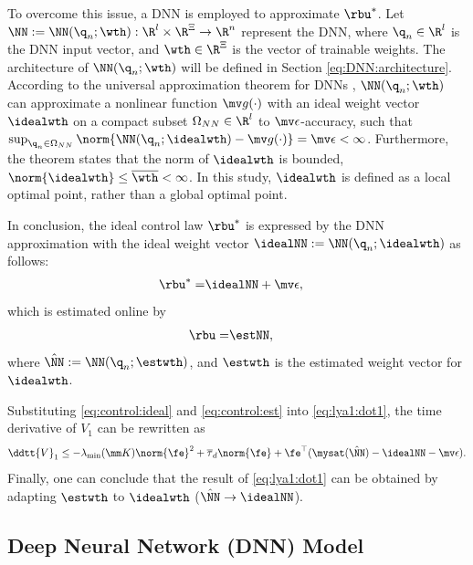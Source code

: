 \documentclass[final,5p,times,twocolumn,authoryear]{elsarticle}
\begin{document}
To overcome this issue, a DNN is employed to approximate $\rbu^*$.
Let $\NN:=\NN({\q}_n;\wth): \R^{l}\times\R^{\Xi}\to\R^{n}$ represent the DNN, where ${\q}_n\in\R^{l}$ is the DNN input vector, and $\wth\in\R^{\Xi}$ is the vector of trainable weights.
The architecture of $\NN({\q}_n;\wth)$ will be defined in Section \ref{eq:DNN:architecture}.
According to the universal approximation theorem for DNNs \cite{Kidger:2020aa}, $\NN({\q}_n;\wth)$ can approximate a nonlinear function $\mv g(\cdot)$ with an ideal weight vector $\idealwth$ on a compact subset $\Omega_{NN}\in\R^{l}$ to $\mv\epsilon$-accuracy, such that $\sup_{{\q}_n\in\Omega_{NN}}\norm{ \NN({\q}_n;\idealwth) - \mv g(\cdot)} = \mv\epsilon < \infty$.
Furthermore, the theorem states that the norm of $\idealwth$ is bounded, \ie $\norm{\idealwth}\le \overline\wth<\infty$.
In this study, $\idealwth$ is defined as a local optimal point, rather than a global optimal point.

In conclusion, the ideal control law $\rbu^*$ is expressed by the DNN approximation with the ideal weight vector $\idealNN:=\NN({\q}_n;\idealwth)$ as follows:
\begin{align}
    \rbu^*=& \idealNN+\mv\epsilon,
    \label{eq:control:ideal}
\end{align}
which is estimated online by
\begin{align}
    \rbu =& \estNN,
    \label{eq:control:est}
\end{align}
where $\hat\NN:=\NN({\q}_n;\estwth)$, and  $\estwth$ is the estimated weight vector for $\idealwth$.

Substituting \eqref{eq:control:ideal} and \eqref{eq:control:est} into \eqref{eq:lya1:dot1}, the time derivative of $V_1$ can be rewritten as
\begin{equation}
    \ddtt{V}_1
    \le 
    -\lambda_{\min}(\mm K)\norm{\fe}^2
    +
    \overline\tau_d\norm{\fe}
    +
    \fe^\top (\mysat(\hat\NN)-\idealNN-\mv\epsilon)
    .
    \label{eq:lya1:dot2}
\end{equation}
Finally, one can conclude that the result of \eqref{eq:lya1:dot1} can be obtained by adapting $\estwth$ to $\idealwth$ (\ie $\hat\NN\to\idealNN$).

\subsection{Deep Neural Network (DNN) Model}\label{sec:sub:NN definition}
\end{document}

